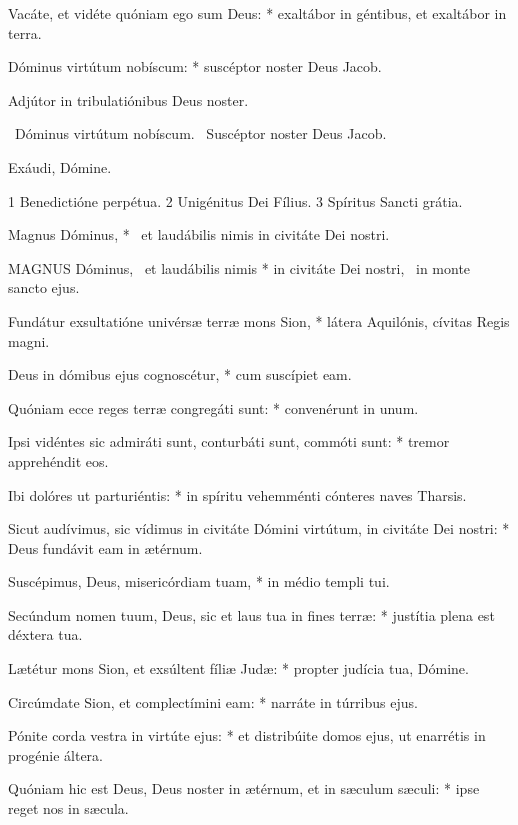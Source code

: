 Vacáte, et vidéte quóniam ego sum Deus: * exaltábor in géntibus, et exaltábor in terra.

Dóminus virtútum nobíscum: * suscéptor noster Deus Jacob.

 Adjútor in tribulatiónibus Deus noster.


\V\ Dóminus virtútum nobíscum. \R\ Suscéptor noster Deus Jacob.

 Exáudi, Dómine.

 1 Benedictióne perpétua. 2 Unigénitus Dei Fílius. 3 Spíritus Sancti grátia.


 Magnus Dóminus, * \textdagger\ et laudábilis nimis in civitáte Dei nostri. \textdaggerdbl


\lettrine[lines=2]{M}{AGNUS} Dóminus, \textdagger\ et laudábilis nimis * in civitáte Dei nostri, \textdaggerdbl\ in monte sancto ejus.

Fundátur exsultatióne univérsæ terræ mons Sion, * látera Aquilónis, cívitas Regis magni.

Deus in dómibus ejus cognoscétur, * cum suscípiet eam.

Quóniam ecce reges terræ congregáti sunt: * convenérunt in unum.

Ipsi vidéntes sic admiráti sunt, conturbáti sunt, commóti sunt: * tremor apprehéndit eos.

Ibi dolóres ut parturiéntis: * in spíritu vehemménti cónteres naves Tharsis.

Sicut audívimus, sic vídimus in civitáte Dómini virtútum, in civitáte Dei nostri: * Deus fundávit eam in ætérnum.

Suscépimus, Deus, misericórdiam tuam, * in médio templi tui.

Secúndum nomen tuum, Deus, sic et laus tua in fines terræ: * justítia plena est déxtera tua.

Lætétur mons Sion, et exsúltent fíliæ Judæ: * propter judícia tua, Dómine.

Circúmdate Sion, et complectímini eam: * narráte in túrribus ejus.

Pónite corda vestra in virtúte ejus: * et distribúite domos ejus, ut enarrétis in progénie áltera.

Quóniam hic est Deus, Deus noster in ætérnum, et in sæculum sæculi: * ipse reget nos in sæcula.

